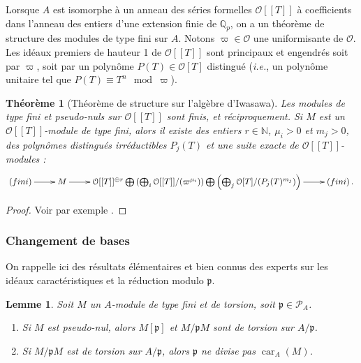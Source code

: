 \documentclass[12pt]{amsart}
\newcommand\bN{\mathbb{N}}
\newcommand\Qp{\mathbb{Q}_{p}}
\newcommand\cO{\mathcal{O}}
\newcommand\cP{\mathcal{P}}
\newcommand\gp{\mathfrak{p}}
\DeclareMathOperator{\car}{car}
\theoremstyle{defstyle}
\theoremstyle{thmstyle}
\newtheorem{theorem}[subsubsection]{Théorème}
\newtheorem{lemme}[subsubsection]{Lemme}
\begin{document}
Lorsque $A$ est isomorphe à un anneau des séries formelles $\cO[[T]]$ à coefficients dans l'anneau des entiers d'une extension finie de $\Qp$, on a un théorème de structure des modules de type fini sur $A$. Notons $\varpi\in\cO$ une uniformisante de $\cO$. Les idéaux premiers de hauteur 1 de $\cO[[T]]$ sont principaux et engendrés soit par $\varpi$, soit par un polynôme $P(T)\in\cO[T]$ distingué (\textit{i.e.}, un polynôme unitaire tel que $P(T) \equiv T^n \mod \varpi$). 

\begin{theorem}[Théorème de structure sur l'algèbre d'Iwasawa] \label{th:structure_sur_algebre_iwasawa}
	Les modules de type fini et pseudo-nuls sur $\cO[[T]]$ sont finis, et réciproquement. Si $M$ est un $\cO[[T]]$-module de type fini, alors il existe des entiers $r\in\bN$, $\mu_i>0$ et $m_j>0$, des polynômes distingués irréductibles $P_j(T)$ et une suite exacte de $\cO[[T]]$-modules :
	$$\xymatrix{
		\left(\textrm{fini}\right) \ar[r] & M  
		\ar[r]& \cO[[T]]^{\oplus r} \bigoplus \left(\bigoplus_i \cO[[T]]/(\varpi^{\mu_i}) \right) \bigoplus \left( \bigoplus_j \cO[T]/(P_j(T)^{m_j}) \right) \ar[r] & \left(\textrm{fini}\right).
	}$$
\end{theorem}

\begin{proof}
	Voir par exemple \cite[Chap. 5, Theorem 3.1]{langCYC}.
\end{proof}

\subsubsection{Changement de bases}
On rappelle ici des résultats élémentaires et bien connus des experts sur les idéaux caractéristiques et la réduction modulo $\gp$. 
\begin{lemme}\label{lemme_pseudo}
	Soit $M$ un $A$-module de type fini et de torsion, soit $\gp \in\cP_A$.
	\begin{enumerate}
		\item Si $M$ est pseudo-nul, alors $M[\gp]$ et $M/\gp M$ sont de torsion sur $A/\gp$.
		\item Si $M/\gp M$ est de torsion sur $A/\gp$, alors $\gp$ ne divise pas $\car_A(M)$.
	\end{enumerate}
\end{lemme}
%	
%
\end{document}
